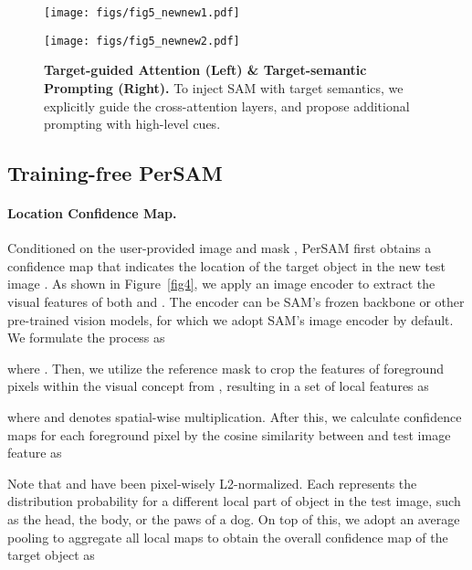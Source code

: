 \documentclass{article} \usepackage{iclr2024_conference,times}
\makeatletter
\newcommand\figcaption{\def\@captype{figure}\caption}
\makeatother
\begin{document}
\begin{figure*}[t!]
\vspace{-0.2cm}
\begin{minipage}[t]{0.47\textwidth}
\texttt{[image: figs/fig5\_newnew1.pdf]}
\figcaption{\textbf{Positive-negative Location Prior.} We calculate a location confidence map for the target object in new test image by the appearance of all local parts. Then, we select the location prior as the point prompt for PerSAM.}
\label{fig4}
\end{minipage}
\hspace{0.2in}
\begin{minipage}[t]{0.47\textwidth}
\texttt{[image: figs/fig5\_newnew2.pdf]}
\figcaption{\textbf{Target-guided Attention (Left) \& Target-semantic Prompting (Right).} To inject SAM with target semantics, we explicitly guide the cross-attention layers, and propose additional prompting with high-level cues.}
\label{fig5}
\end{minipage}
\end{figure*}

\subsection{Training-free PerSAM}
\label{s3.2}

\paragraph{Location Confidence Map.}
Conditioned on the user-provided image  and mask , PerSAM first obtains a confidence map that indicates the location of the target object in the new test image .
As shown in Figure~\ref{fig4}, we apply an image encoder to extract the visual features of both  and . The encoder can be SAM's frozen backbone or other pre-trained vision models, for which we adopt SAM's image encoder  by default. We formulate the process as

where .
Then, we utilize the reference mask  to crop the features of foreground pixels within the visual concept from , resulting in a set of  local features as

where  and  denotes spatial-wise multiplication. After this, we calculate  confidence maps for each foreground pixel  by the cosine similarity between  and test image feature  as

Note that  and  have been pixel-wisely L2-normalized. Each  represents the distribution probability for a different local part of object in the test image, such as the head, the body, or the paws of a dog. On top of this, we adopt an average pooling to aggregate all  local maps to obtain the overall confidence map of the target object as 
\end{document}
